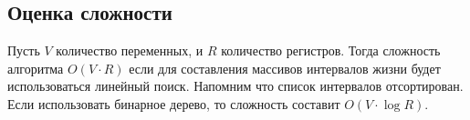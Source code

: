 \begin{example}
\end{example}

\subsection{Оценка сложности}

Пусть $V$ количество переменных, и $R$ количество регистров.
Тогда сложность алгоритма $\textit{O}(V \cdot R)$ если для составления массивов интервалов жизни будет использоваться
линейный поиск.
Напомним что список интервалов отсортирован.
Если использовать бинарное дерево, то сложность составит $\textit{O}(V \cdot \log R)$.